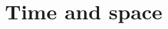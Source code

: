 \documentclass[a4paper,12pt,%
onecolumn,oneside,%
british%
]{memoir}
\renewcommand*{\|}[1][]{\nonscript\:#1\vert\nonscript\:\mathopen{}}
\begin{document}
















\printpagenotes*
\clearpage
\chapter{Time and space}
\label{cha:time_space}
\setcounter{section}{-1}
\end{document}
